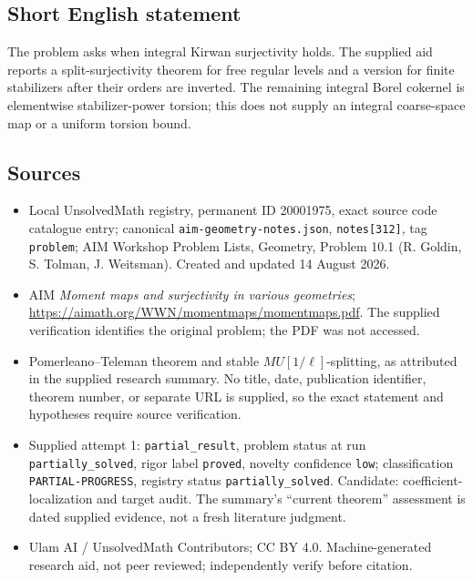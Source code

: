\documentclass[11pt]{article}
\begin{document}
\subsection{Short English statement}
The problem asks when integral Kirwan surjectivity holds. The supplied aid reports a split-surjectivity theorem for free regular levels and a version for finite stabilizers after their orders are inverted. The remaining integral Borel cokernel is elementwise stabilizer-power torsion; this does not supply an integral coarse-space map or a uniform torsion bound.
\subsection{Sources}
\begin{itemize}
\item Local UnsolvedMath registry, permanent ID 20001975, exact source code catalogue entry; canonical \texttt{aim-geometry-notes.json}, \texttt{notes[312]}, tag \texttt{problem}; AIM Workshop Problem Lists, Geometry, Problem 10.1 (R. Goldin, S. Tolman, J. Weitsman). Created and updated 14 August 2026.
\item AIM \emph{Moment maps and surjectivity in various geometries}; \url{https://aimath.org/WWN/momentmaps/momentmaps.pdf}. The supplied verification identifies the original problem; the PDF was not accessed.
\item Pomerleano--Teleman theorem and stable \(MU[1/\ell]\)-splitting, as attributed in the supplied research summary. No title, date, publication identifier, theorem number, or separate URL is supplied, so the exact statement and hypotheses require source verification.
\item Supplied attempt 1: \texttt{partial\_result}, problem status at run \texttt{partially\_solved}, rigor label \texttt{proved}, novelty confidence \texttt{low}; classification \texttt{PARTIAL-PROGRESS}, registry status \texttt{partially\_solved}. Candidate: coefficient-localization and target audit. The summary's ``current theorem'' assessment is dated supplied evidence, not a fresh literature judgment.
\item Ulam AI / UnsolvedMath Contributors; CC BY 4.0. Machine-generated research aid, not peer reviewed; independently verify before citation.
\end{itemize}
\end{document}
